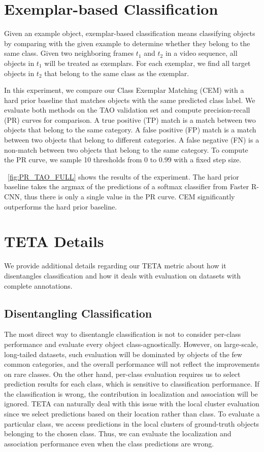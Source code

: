 \documentclass[runningheads]{llncs}
\begin{document}
\section{Exemplar-based Classification}


Given an example object, exemplar-based classification means classifying objects by comparing with the given example to determine whether they belong to the same class.
Given two neighboring frames $t_1$ and $t_2$ in a video sequence, all objects in $t_1$ will be treated as exemplars.
For each exemplar, we find all target objects in $t_2$ that belong to the same class as the exemplar.

In this experiment, we compare our Class Exemplar Matching (CEM) with a hard prior baseline that matches objects with the same predicted class label.
We evaluate both methods on the TAO validation set
and compute precision-recall (PR) curves for comparison.
A true positive (TP) match is a match between two objects that belong to the same category.
A false positive (FP) match is a match between two objects that belong to different categories.
A false negative (FN) is a non-match between two objects that belong to the same category.
To compute the PR curve, we sample 10 thresholds from 0 to 0.99 with a fixed step size.


\figurename~\ref{fig:PR_TAO_FULL} shows the results of the experiment.
The hard prior baseline takes the argmax of the predictions of a softmax classifier from Faster R-CNN, thus there is only a single value in the PR curve. CEM significantly outperforms the hard prior baseline.


\section{TETA Details}

We provide additional details regarding our TETA metric about how it disentangles classification and how it deals with evaluation on datasets with complete annotations.

\subsection{Disentangling Classification}

The most direct way to disentangle classification is not to consider per-class performance and evaluate every object class-agnostically.
However, on large-scale, long-tailed datasets, such evaluation will be dominated by objects of the few common categories,
and the overall performance will not reflect the improvements on rare classes.
On the other hand, per-class evaluation requires us to select prediction results for each class, which is sensitive to classification performance.
If the classification is wrong, the contribution in localization and association will be ignored. 
TETA can naturally deal with this issue with the local cluster evaluation since we select predictions based on their location rather than class.
To evaluate a particular class, we access predictions in the local clusters of ground-truth objects belonging to the chosen class.
Thus, we can evaluate the localization and association performance even when the class predictions are wrong.
\end{document}

